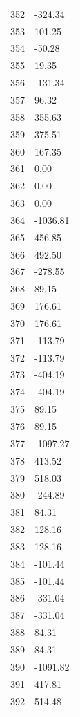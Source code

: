 \documentclass[a4paper,11pt]{article}
\begin{document}
\begin{center}
\begin{longtable}{|R{1.5cm}|R{2.5cm}|}
  352 &      -324.34 \\
  353 &       101.25 \\
  354 &       -50.28 \\
  355 &        19.35 \\
  356 &      -131.34 \\
  357 &        96.32 \\
  358 &       355.63 \\
  359 &       375.51 \\
  360 &       167.35 \\
  361 &         0.00 \\
  362 &         0.00 \\
  363 &         0.00 \\
  364 &     -1036.81 \\
  365 &       456.85 \\
  366 &       492.50 \\
  367 &      -278.55 \\
  368 &        89.15 \\
  369 &       176.61 \\
  370 &       176.61 \\
  371 &      -113.79 \\
  372 &      -113.79 \\
  373 &      -404.19 \\
  374 &      -404.19 \\
  375 &        89.15 \\
  376 &        89.15 \\
 {\color{red} 377} & {\color{red}    -1097.27} \\
  378 &       413.52 \\
  379 &       518.03 \\
  380 &      -244.89 \\
  381 &        84.31 \\
  382 &       128.16 \\
  383 &       128.16 \\
  384 &      -101.44 \\
  385 &      -101.44 \\
  386 &      -331.04 \\
  387 &      -331.04 \\
  388 &        84.31 \\
  389 &        84.31 \\
  390 &     -1091.82 \\
  391 &       417.81 \\
  392 &       514.48 \\

\end{longtable}
\end{center}
\end{document}
